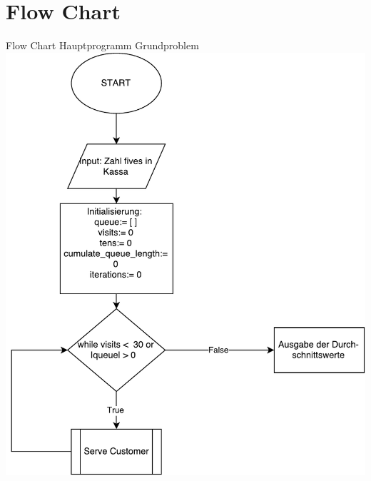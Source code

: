 \section{Flow Chart}
\begin{frame}{Flow Chart Hauptprogramm Grundproblem}
	\centering
  	\includegraphics[scale=0.4]{BSP18_Flow_Chart_1.pdf}
\end{frame}

